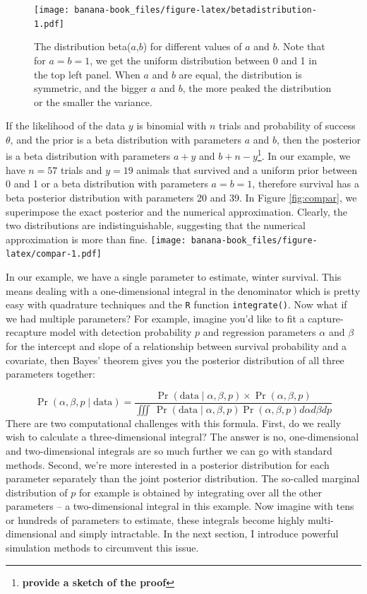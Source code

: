 \documentclass[
  12pt,
]{krantz}
\begin{document}
\begin{figure}
\centering
\texttt{[image: banana-book\_files/figure-latex/betadistribution-1.pdf]}
\caption{\label{fig:betadistribution}The distribution beta(\(a\),\(b\)) for different values of \(a\) and \(b\). Note that for \(a = b = 1\), we get the uniform distribution between 0 and 1 in the top left panel. When \(a\) and \(b\) are equal, the distribution is symmetric, and the bigger \(a\) and \(b\), the more peaked the distribution or the smaller the variance.}
\end{figure}

If the likelihood of the data \(y\) is binomial with \(n\) trials and probability of success \(\theta\), and the prior is a beta distribution with parameters \(a\) and \(b\), then the posterior is a beta distribution with parameters \(a + y\) and \(b + n - y\)\footnote{\textbf{provide a sketch of the proof}}. In our example, we have \(n = 57\) trials and \(y = 19\) animals that survived and a uniform prior between 0 and 1 or a beta distribution with parameters \(a = b = 1\), therefore survival has a beta posterior distribution with parameters 20 and 39. In Figure \ref{fig:compar}, we superimpose the exact posterior and the numerical approximation. Clearly, the two distributions are indistinguishable, suggesting that the numerical approximation is more than fine.
\texttt{[image: banana-book\_files/figure-latex/compar-1.pdf]}

In our example, we have a single parameter to estimate, winter survival. This means dealing with a one-dimensional integral in the denominator which is pretty easy with quadrature techniques and the \texttt{R} function \texttt{integrate()}. Now what if we had multiple parameters? For example, imagine you'd like to fit a capture-recapture model with detection probability \(p\) and regression parameters \(\alpha\) and \(\beta\) for the intercept and slope of a relationship between survival probability and a covariate, then Bayes' theorem gives you the posterior distribution of all three parameters together:

\[ \Pr(\alpha, \beta, p \mid \text{data}) = \frac{ \Pr(\text{data} \mid \alpha, \beta, p) \times \Pr(\alpha, \beta, p)}{\iiint \, \Pr(\text{data} \mid \alpha, \beta, p) \Pr(\alpha, \beta, p) d\alpha d\beta dp} \]
There are two computational challenges with this formula. First, do we really wish to calculate a three-dimensional integral? The answer is no, one-dimensional and two-dimensional integrals are so much further we can go with standard methods. Second, we're more interested in a posterior distribution for each parameter separately than the joint posterior distribution. The so-called marginal distribution of \(p\) for example is obtained by integrating over all the other parameters -- a two-dimensional integral in this example. Now imagine with tens or hundreds of parameters to estimate, these integrals become highly multi-dimensional and simply intractable. In the next section, I introduce powerful simulation methods to circumvent this issue.
\end{document}
